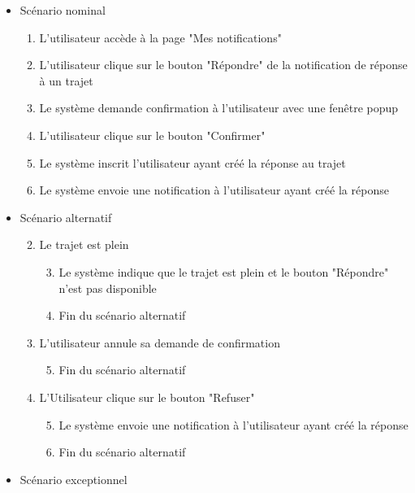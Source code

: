 \begin{itemize}
\begin{itemize}
    \item Scénario nominal
    \begin{enumerate}
        \item L'utilisateur accède à la page "Mes notifications"
        \item L'utilisateur clique sur le bouton "Répondre" de la notification de réponse à un trajet
        \item Le système demande confirmation à l'utilisateur avec une fenêtre popup
        \item L'utilisateur clique sur le bouton "Confirmer"
        \item Le système inscrit l'utilisateur ayant créé la réponse au trajet
        \item Le système envoie une notification à l'utilisateur ayant créé la réponse
    \end{enumerate}
    \item Scénario alternatif
    \begin{enumerate}[{1{a}.}]\setcounter{enumi}{1}
            \item Le trajet est plein
            \begin{enumerate}[{1.}]\setcounter{enumii}{2}
                \item Le système indique que le trajet est plein et le bouton "Répondre" n'est pas disponible
                \item Fin du scénario alternatif
            \end{enumerate}
            \setcounter{enumi}{3}
            \item L'utilisateur annule sa demande de confirmation
            \begin{enumerate}[{1.}]\setcounter{enumii}{4}
                \item Fin du scénario alternatif
            \end{enumerate}
        \end{enumerate}
            \begin{enumerate}[{1{b}.}]\setcounter{enumi}{3}
                \item L'Utilisateur clique sur le bouton "Refuser"
                \begin{enumerate}[{1.}]\setcounter{enumii}{4}
                    \item Le système envoie une notification à l'utilisateur ayant créé la réponse
                    \item Fin du scénario alternatif
                \end{enumerate}
        \end{enumerate}
    \item Scénario exceptionnel
\end{itemize}


\end{itemize}
